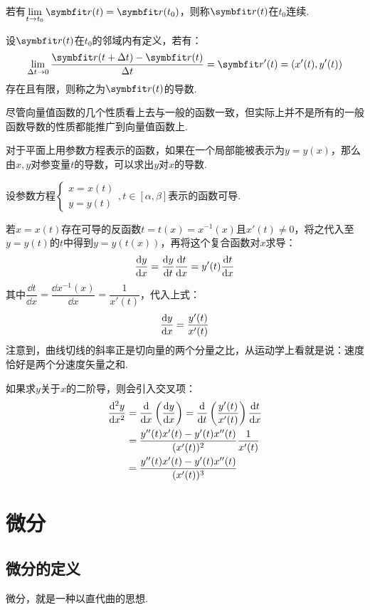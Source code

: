 \begin{definition}
    若有$\lim\limits_{t \to t_0}\vb{r}(t) = \vb{r}(t_0)$，则称$\vb{r}(t)$在$t_0$连续.
\end{definition}

\begin{definition}
    设$\vb{r}(t)$在$t_0$的邻域内有定义，若有：
    \[\lim\limits_{\Delta t \to 0} \dfrac{\vb{r}(t+\Delta t) - \vb{r}(t)}{\Delta t} = \vb{r}'(t) = (x'(t),y'(t))\]
    存在且有限，则称之为$\vb{r}(t)$的导数.
\end{definition}

尽管向量值函数的几个性质看上去与一般的函数一致，但实际上并不是所有的一般函数导数的性质都能推广到向量值函数上.

\begin{derivation}
    对于平面上用参数方程表示的函数，如果在一个局部能被表示为$y=y(x)$，那么由$x,y$对参变量$t$的导数，可以求出$y$对$x$的导数.

    设参数方程$\begin{cases}
        x=x(t) \\
        y=y(t)
    \end{cases},t\in[\alpha,\beta]$表示的函数可导.

    若$x=x(t)$存在可导的反函数$t=t(x)=x^{-1}(x)$且$x'(t)\neq 0$，将之代入至$y=y(t)$的$t$中得到$y=y(t(x))$，再将这个复合函数对$x$求导：
    \[\dv{y}{x} = \dv{y}{t}\dv{t}{x} = y'(t)\dv{t}{x}\]
    其中$\dfrac{\dd{t}}{\dd{x}} = \dfrac{\dd{x^{-1}(x)}}{\dd{x}}=\dfrac{1}{x'(t)}$，代入上式：
    \[\dv{y}{x} = \frac{y'(t)}{x'(t)}\]
    注意到，曲线切线的斜率正是切向量的两个分量之比，从运动学上看就是说：速度恰好是两个分速度矢量之和.

    如果求$y$关于$x$的二阶导，则会引入交叉项：
    \begin{align*}
        \dv[2]{y}{x} &= \dv{x}\left(\dv{y}{x}\right) = \dv{t}\left(\frac{y'(t)}{x'(t)}\right)\dv{t}{x}\\
        &= \frac{y''(t)x'(t)-y'(t)x''(t)}{(x'(t))^2}\frac{1}{x'(t)}\\
        &= \frac{y''(t)x'(t)-y'(t)x''(t)}{(x'(t))^3}
    \end{align*}
\end{derivation}


\section{微分}
\subsection{微分的定义}
微分，就是一种以直代曲的思想.


